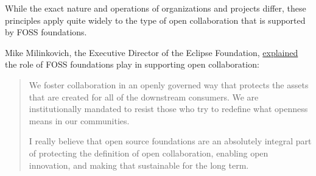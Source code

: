 While the exact nature and operations of organizations and projects differ, these principles apply quite widely to the type of open collaboration that is supported by FOSS foundations.

\begin{kaobox}[frametitle=FOSS foundations: protecting the definition of open collaboration]

Mike Milinkovich, the Executive Director of the Eclipse Foundation, \href{https://twitter.com/stephenrwalli/status/1358884486289629190}{explained} the role of FOSS foundations play in supporting open collaboration:

\begin{quote}

We foster collaboration in an openly governed way that protects the assets that are created for all of the downstream consumers. We are institutionally mandated to resist those who try to redefine what openness means in our communities.

I really believe that open source foundations are an absolutely integral part of protecting the definition of open collaboration, enabling open innovation, and making that sustainable for the long term.

\end{quote}

\end{kaobox}

